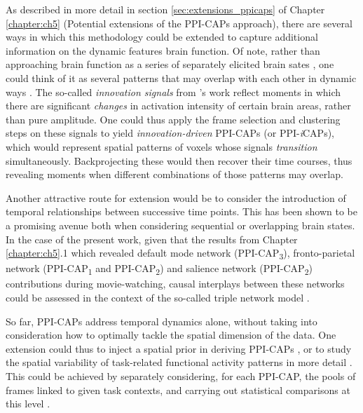 As described in more detail in section \ref{sec:extensions_ppicaps} of Chapter \ref{chapter:ch5} (Potential extensions of the PPI-CAPs approach), there are several ways in which this methodology could be extended to capture additional information on the dynamic features brain function. Of  note, rather than approaching brain function as a series of separately elicited brain sates \citep{Leonardi2014,Gonzalez-Castillo2015a, Freitas2020}, one could think of it as several patterns that may overlap with each other in dynamic ways \citep{Karahanoglu2013,Karahanoglu2015a}. The so-called \textit{innovation signals} from \citet{Karahanoglu2013}'s work reflect moments in which there are significant \textit{changes} in activation intensity of certain brain areas, rather than pure amplitude.
One could thus apply the frame selection and clustering steps on these signals to yield \textit{innovation-driven} PPI-CAPs (or PPI-\textit{i}CAPs), which would represent spatial patterns of voxels whose signals \textit{transition} simultaneously. Backprojecting these would then recover their time courses, thus revealing moments when different combinations of those patterns may overlap.   


Another attractive route for extension would be to consider the introduction of temporal relationships between successive time points. This has been shown to be a promising avenue both when considering sequential \citep{Eavani2013,Chen2016, Vidaurre2017} or overlapping \citep{Sourty2016, Bolton2018a} brain states. In the case of the present work, given that the results from Chapter \ref{chapter:ch5}.1 which revealed default mode network (PPI-CAP\textsubscript{3}), fronto-parietal network (PPI-CAP\textsubscript{1} and PPI-CAP\textsubscript{2}) and salience network (PPI-CAP\textsubscript{2}) contributions during movie-watching, causal interplays between these networks could be assessed in the context of the so-called triple network model \citep{Menon2011}. 

So far, PPI-CAPs address temporal dynamics alone, without taking into consideration how to optimally tackle the spatial dimension of the data. One extension could thus to inject a spatial prior in deriving PPI-CAPs \citep{Zhuang2018}, or to study the spatial variability of task-related functional activity patterns in more detail \citep{Kiviniemi2011}. This could be achieved by separately considering, for each PPI-CAP, the pools of frames linked to given task contexts, and carrying out statistical comparisons at this level \citep{Amico2014}. 


